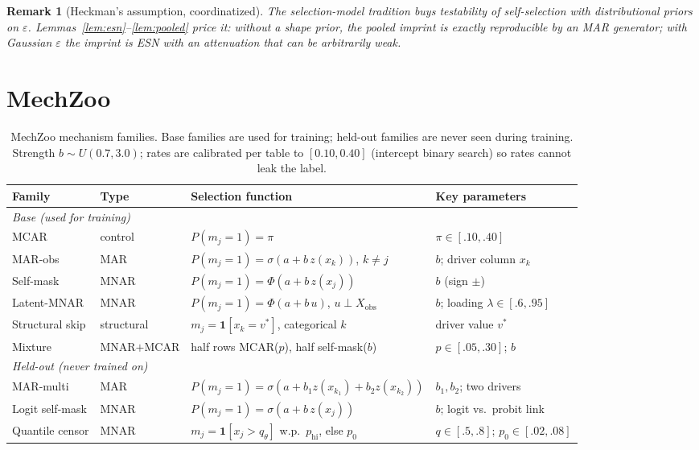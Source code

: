 \documentclass[conference]{IEEEtran}
\newtheorem{remark}{Remark}
\begin{document}
\begin{remark}[Heckman's assumption, coordinatized]\label{rem:heckman}
The selection-model tradition \cite{heckman1979,dk1994} buys testability of self-selection with
distributional priors on $\varepsilon$. Lemmas~\ref{lem:esn}--\ref{lem:pooled} price it: without a
shape prior, the pooled imprint is exactly reproducible by an MAR generator; with Gaussian
$\varepsilon$ the imprint is ESN with an attenuation that can be arbitrarily weak.
\end{remark}


\section{MechZoo}\label{sec:bench}

\begin{table}[t]
\caption{MechZoo mechanism families. Base families are used for training; held-out families
are never seen during training. Strength $b\sim U(0.7,3.0)$; rates are calibrated per table
to $[0.10,0.40]$ (intercept binary search) so rates cannot leak the label.}
\label{tab:mechzoo}
\centering\small
\begin{tabular}{llll}
\toprule
Family & Type & Selection function & Key parameters \\
\midrule
\multicolumn{4}{l}{\emph{Base (used for training)}} \\
MCAR & control & $P(m_j{=}1)=\pi$ & $\pi\in[.10,.40]$ \\
MAR-obs & MAR & $P(m_j{=}1)=\sigma(a{+}b\,z(x_k))$, $k\ne j$ & $b$; driver column $x_k$ \\
Self-mask & MNAR & $P(m_j{=}1)=\Phi(a{+}b\,z(x_j))$ & $b$ (sign $\pm$) \\
Latent-MNAR & MNAR & $P(m_j{=}1)=\Phi(a{+}b\,u)$, $u\perp X_{\mathrm{obs}}$ & $b$; loading $\lambda\in[.6,.95]$ \\
Structural skip & structural & $m_j=\mathbf{1}[x_k{=}v^*]$, categorical $k$ & driver value $v^*$ \\
Mixture & MNAR$+$MCAR & half rows MCAR($p$), half self-mask($b$) & $p\in[.05,.30]$; $b$ \\
\midrule
\multicolumn{4}{l}{\emph{Held-out (never trained on)}} \\
MAR-multi & MAR & $P(m_j{=}1)=\sigma(a{+}b_1z(x_{k_1}){+}b_2z(x_{k_2}))$ & $b_1,b_2$; two drivers \\
Logit self-mask & MNAR & $P(m_j{=}1)=\sigma(a{+}b\,z(x_j))$ & $b$; logit vs.\ probit link \\
Quantile censor & MNAR & $m_j=\mathbf{1}[x_j>q_\theta]$ w.p.\ $p_{\mathrm{hi}}$, else $p_0$ & $q\in[.5,.8]$; $p_0\in[.02,.08]$ \\
\bottomrule
\end{tabular}
\end{table}
\end{document}
